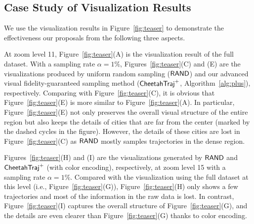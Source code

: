 \subsection{Case Study of Visualization Results}\label{sec:case}
We use the visualization results in Figure~\ref{fig:teaser} to demonstrate the effectiveness our proposals from the following three aspects.

At zoom level 11, Figure~\ref{fig:teaser}(A) is the visualization result of the full \pt{} dataset.
With a sampling rate $\alpha \!=\! 1\%$, Figures~\ref{fig:teaser}(C) and (E) are the visualizations produced by uniform random sampling ($\mathsf{RAND}$)
and our advanced visual fidelity-guaranteed sampling method ($\mathsf{CheetahTraj}^{+}$, Algorithm~\ref{alg:plus}), respectively. Comparing with Figure~\ref{fig:teaser}(C), it is obvious that Figure~\ref{fig:teaser}(E) is more similar to Figure~\ref{fig:teaser}(A). In particular, Figure~\ref{fig:teaser}(E) not only preserves the overall visual structure of the entire region but also keeps the details of cities that are far from the center (marked by the dashed cycles in the figure). However, the details of these cities are lost in Figure~\ref{fig:teaser}(C) as $\mathsf{RAND}{}$ mostly samples trajectories in the dense region.

Figures~\ref{fig:teaser}(H) and (I) are the visualizations generated by $\mathsf{RAND}$ and $\mathsf{CheetahTraj}^{+}$  (with color encoding), respectively, at zoom level 15 with a sampling rate $\alpha=1\%$.
Compared with the visualization using the full dataset at this level (i.e., Figure~\ref{fig:teaser}(G)), Figure~\ref{fig:teaser}(H) only shows a few trajectories and most of the information in the raw data is lost. In contrast, Figure~\ref{fig:teaser}(I) captures the overall structure of Figure~\ref{fig:teaser}(G), and the details are even clearer than Figure~\ref{fig:teaser}(G) thanks to color encoding.

